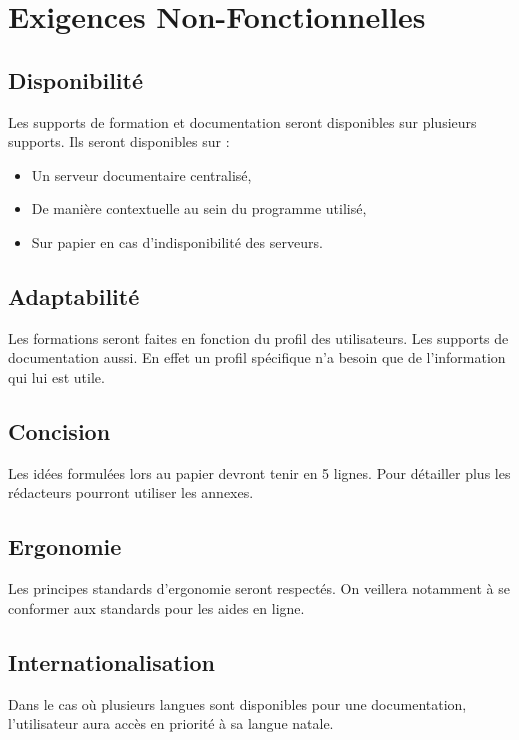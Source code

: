\section{Exigences Non-Fonctionnelles}

\subsection{Disponibilité}

Les supports de formation et documentation seront disponibles sur plusieurs supports.
Ils seront disponibles sur : 
\begin{itemize}
\item Un serveur documentaire centralisé,
\item De manière contextuelle au sein du programme utilisé,
\item Sur papier en cas d'indisponibilité des serveurs.
\end{itemize}

\subsection{Adaptabilité}

Les formations seront faites en fonction du profil des utilisateurs. 
Les supports de documentation aussi. En effet un profil spécifique n'a besoin
que de l'information qui lui est utile.

\subsection{Concision}

Les idées formulées lors au papier devront tenir en 5 lignes. Pour détailler plus
les rédacteurs pourront utiliser les annexes.

\subsection{Ergonomie}

Les principes standards d'ergonomie seront respectés. On veillera notamment à se
conformer aux standards pour les aides en ligne.

\subsection{Internationalisation}

Dans le cas où plusieurs langues sont disponibles pour une documentation, l'utilisateur
aura accès en priorité à sa langue natale.

\vfill
\pagebreak
